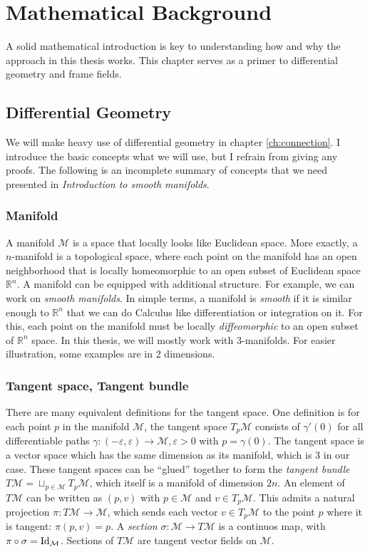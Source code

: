 \documentclass[../thesis.tex]{subfiles}
\begin{document}
\chapter{Mathematical Background}\label{ch:math-background}

A solid mathematical introduction is key to understanding how and why the approach
in this thesis works. This chapter serves as a primer to differential geometry and frame fields.
\section{Differential Geometry}
We will make heavy use of differential geometry in chapter \ref{ch:connection}.
I introduce the basic concepts what we will use, but I refrain from
giving any proofs. The following is an incomplete summary of concepts that we need presented in
\emph{Introduction to smooth manifolds}\cite{LeeManifold}.

\subsection{Manifold} A manifold $\mathcal{M}$ is a space that locally looks like Euclidean space.
More exactly, a $n$-manifold is a topological space, where each point on the manifold has an open neighborhood
that is locally homeomorphic to an open subset of Euclidean space $\mathbb{R}^n$.
A manifold can be equipped with additional structure. For example, we can work on \emph{smooth manifolds}.
In simple terms, a manifold is \emph{smooth} if it is similar enough to $\mathbb{R}^n$ that we can do Calculus
like differentiation or integration on it. For this, each point on the manifold must be
locally \emph{diffeomorphic} to an open subset of $\mathbb{R}^n$ space.
In this thesis, we will mostly work with 3-manifolds. For easier illustration, some examples are in 2 dimensions.

\subsection{Tangent space, Tangent bundle} There are many equivalent definitions
for the tangent space. One definition is for each point $p$ in the manifold $\mathcal{M}$,
the tangent space $T_p\mathcal{M}$ consists of $\gamma'(0)$ for all differentiable paths $\gamma: (-\varepsilon, \varepsilon) \to \mathcal{M}, \varepsilon > 0$
with $p = \gamma(0)$. The tangent space is a vector space which has the same dimension as its manifold,
which is 3 in our case. These tangent spaces can be ``glued'' together to form the
\emph{tangent bundle} $T\mathcal{M} = \sqcup _{p \in \mathcal{M}}T_p\mathcal{M}$, which itself
is a manifold of dimension $2n$. An element of $T\mathcal{M}$ can be written
as $(p,v)$ with $p \in \mathcal{M}$ and $v \in T_p\mathcal{M}$. This admits a natural projection $\pi : T\mathcal{M} \to \mathcal{M}$,
which sends each vector $v \in T_p\mathcal{M}$ to the point $p$ where it is tangent: $\pi(p,v)=p$.
A \emph{section} $\sigma: \mathcal{M} \to T\mathcal{M}$ is a continuos map, with $\pi \circ \sigma = \operatorname{Id}_{\mathcal{M}}$.
Sections of $T\mathcal{M}$ are tangent vector fields on $\mathcal{M}$.
\end{document}

